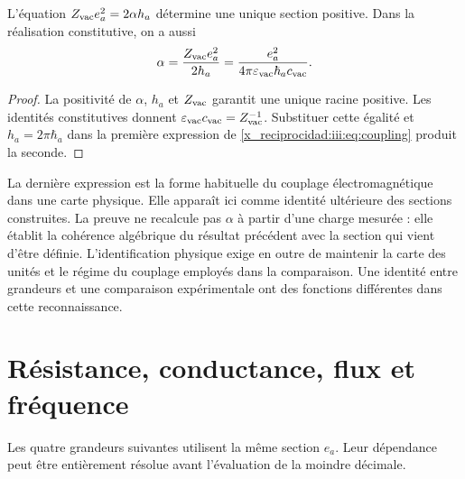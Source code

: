 \begin{proposition}
L’équation $Z_{\rm vac}e_a^2=2\alpha h_a$ détermine une unique section
positive. Dans la réalisation constitutive, on a aussi
\begin{equation}
 \alpha=\frac{Z_{\rm vac}e_a^2}{2h_a}
 =\frac{e_a^2}{4\pi\varepsilon_{\rm vac}\hbar_a c_{\rm vac}}.
 \label{x_reciprocidad:iii:eq:coupling}
\end{equation}
\end{proposition}
\begin{proof}
La positivité de $\alpha$, $h_a$ et $Z_{\rm vac}$ garantit une unique racine positive. Les identités constitutives donnent $\varepsilon_{\rm vac}c_{\rm vac}=Z_{\rm vac}^{-1}$. Substituer cette égalité et $h_a=2\pi\hbar_a$ dans la première expression de \eqref{x_reciprocidad:iii:eq:coupling} produit la seconde.
\end{proof}

La dernière expression est la forme habituelle du couplage électromagnétique
dans une carte physique. Elle apparaît ici comme identité ultérieure des sections
construites. La preuve ne recalcule pas $\alpha$ à partir d’une charge
mesurée : elle établit la cohérence algébrique du résultat précédent avec la
section qui vient d’être définie. L’identification physique exige en outre
de maintenir la carte des unités et le régime du couplage employés dans la
comparaison. Une identité entre grandeurs et une comparaison expérimentale
ont des fonctions différentes dans cette reconnaissance.

\section{Résistance, conductance, flux et fréquence}

Les quatre grandeurs suivantes utilisent la même section $e_a$. Leur
dépendance peut être entièrement résolue avant l’évaluation de la moindre décimale.

